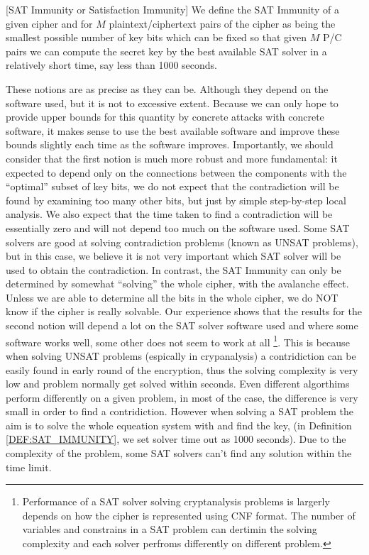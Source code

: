 \begin{mydef} \label{DEF:SAT_IMMUNITY}
	[SAT Immunity or Satisfaction Immunity]
	We define the
	SAT Immunity of
	a given cipher
	and for $M$ plaintext/ciphertext pairs
	of the
	cipher as
	being the smallest possible
	number of key bits
	which can be fixed so that
	given $M$ P/C pairs we
	can compute the secret key by
	the best available SAT solver in a relatively short time,
	say less than 1000 seconds.
\end{mydef}

These notions are as precise as they can be. Although they depend on the software used, but it is not to excessive extent. Because we can only hope to provide upper bounds for this quantity by concrete attacks with concrete software, it makes sense to use the best available software and improve these bounds slightly each time as the software improves.
Importantly, we should consider that the first notion is much more robust and more fundamental: it expected to depend only on the connections between the components with the ``optimal'' subset of key bits, we do not expect that the contradiction will be found by examining too many other bits, but just by simple step-by-step local analysis.
We also expect that the time taken to find a contradiction will be essentially zero and will not depend too much on the software used. Some SAT solvers are good at solving contradiction problems (known as UNSAT problems), but in this case, we believe it is not very important which SAT solver will be used to obtain the contradiction.
In contrast, the SAT Immunity can only be determined by somewhat ``solving'' the whole cipher,
with the avalanche effect.
Unless we are able to determine all the bits in the whole cipher,
we do NOT know if the cipher is really solvable.
Our experience shows that the results for the second notion will depend
a lot on the SAT solver software used and where some software works well,
some other does not seem to work at all \footnote{Performance of a SAT solver solving cryptanalysis problems is largerly depends on how the cipher is represented using CNF format. The number of variables and constrains in a SAT problem can dertimin the solving complexity and each solver perfroms differently on different problem.}. This is because when solving UNSAT problems (espically in crypanalysis) a contridiction can be easily found in early round of the encryption, thus the solving complexity is very low and problem normally get solved within seconds. Even different algorthims perform differently on a given problem, in most of the case, the difference is very small in order to find a contridiction. However when solving a SAT problem the aim is to solve the whole equeation system with and find the key, (in Definition \ref{DEF:SAT_IMMUNITY}, we set solver time out as 1000 seconds). Due to the complexity of the problem, some SAT solvers can't find any solution within the time limit.

